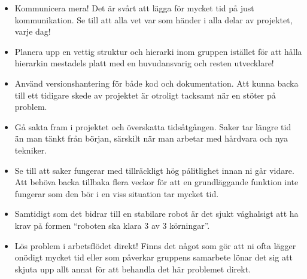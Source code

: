 \documentclass{article}
\begin{document}
\begin{itemize}
    \item Kommunicera mera! Det är svårt att lägga för mycket tid på just kommunikation. Se till att alla vet var som händer i alla delar av projektet, varje dag!
    \item Planera upp en vettig struktur och hierarki inom gruppen istället för att hålla hierarkin mestadels platt med en huvudansvarig och resten utvecklare!
    \item Använd versionshantering för både kod och dokumentation. Att kunna backa till ett tidigare skede av projektet är otroligt tacksamt när en stöter på problem.
    \item Gå sakta fram i projektet och överskatta tidsåtgången. Saker tar längre tid än man tänkt från början, särskilt när man arbetar med hårdvara och nya tekniker.
    \item Se till att saker fungerar med tillräckligt hög pålitlighet innan ni går vidare. Att behöva backa tillbaka flera veckor för att en grundläggande funktion inte fungerar som den bör i en viss situation tar mycket tid.
    \item Samtidigt som det bidrar till en stabilare robot är det sjukt våghalsigt att ha krav på formen ``roboten ska klara 3 av 3 körningar''.
    \item Lös problem i arbetsflödet direkt! Finns det något som gör att ni ofta lägger onödigt mycket tid eller som påverkar gruppens samarbete lönar det sig att skjuta upp allt annat för att behandla det här problemet direkt.
\end{itemize}

\nocite{*}
{}

\end{document}
